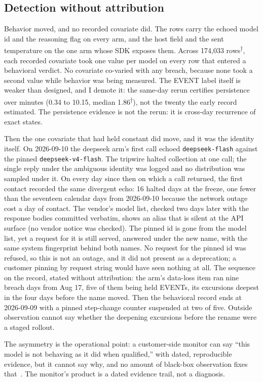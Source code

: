 \documentclass[conference]{IEEEtran}
\newcommand{\rows}{\textsuperscript{$\dagger$}}
\begin{document}
\subsection{Detection without attribution}
\label{sec:attr}

Behavior moved, and no recorded covariate did. The rows carry the
echoed model id and the reasoning flag on every arm, and the host
field and the sent temperature on the one arm whose SDK exposes them.
Across 174,033 rows\rows, each recorded covariate took one value per
model on every row that entered a behavioral verdict. No covariate
co-varied with any breach, because none took a second value while
behavior was being measured. The EVENT label itself is weaker than
designed, and I demote it: the same-day rerun certifies persistence
over minutes (0.34 to 10.15, median 1.86\rows), not the twenty the
early record estimated. The persistence evidence is not the rerun: it
is cross-day recurrence of exact states.

Then the one covariate that had held constant did move, and it was the
identity itself. On 2026-09-10 the deepseek arm's first call echoed
\texttt{deepseek-flash} against the pinned
\texttt{deepseek-v4-flash}. The tripwire halted collection at one call; the single reply under the ambiguous
identity was logged and no distribution was sampled under it. On every
day since then on which a call returned, the first contact recorded
the same divergent echo: 16 halted days at the freeze, one fewer than
the seventeen calendar days from 2026-09-10 because the network outage
cost a day of contact. The vendor's model list, checked two days later
with the response bodies committed verbatim, shows an alias that is
silent at the API surface (no vendor notice was checked). The pinned
id is gone from the model list, yet a request for it is still served,
answered under the new name, with the same system fingerprint behind
both names. No request for the pinned id was refused, so this is not
an outage, and it did not present as a deprecation; a customer pinning
by request string would have seen nothing at all. The sequence on the
record, stated without attribution: the arm's data-loss item ran nine
breach days from Aug 17, five of them being held EVENTs, its
excursions deepest in the four days before the name moved. Then the
behavioral record ends at 2026-09-09 with a pinned step-change counter
suspended at two of five. Outside observation cannot say whether the
deepening excursions before the rename were a staged rollout.

The asymmetry is the operational point: a customer-side monitor can
say ``this model is not behaving as it did when qualified,'' with
dated, reproducible evidence, but it cannot say why, and no amount of
black-box observation fixes that~\cite{casper,cai}. The monitor's
product is a dated evidence trail, not a diagnosis.
\end{document}
